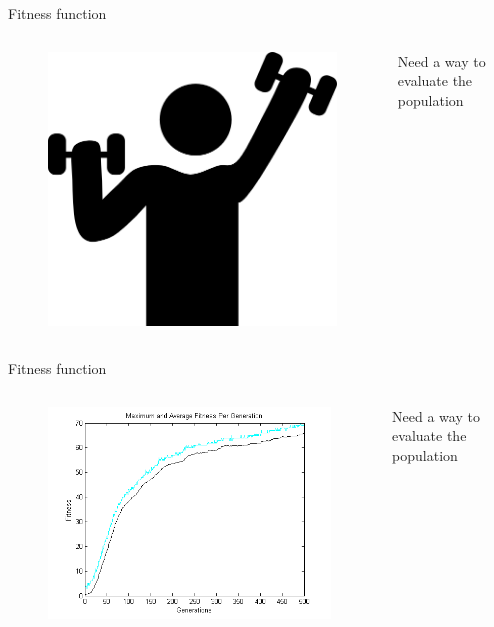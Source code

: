 \documentclass[24pt]{beamer}
\begin{document}
    \begin{frame}{Fitness function}
        \begin{columns}
                \begin{figure}
                \includegraphics[scale=0.5]{fitness}
                \end{figure}
                Need a way to evaluate the population
        \end{columns}
    \end{frame}

    \begin{frame}{Fitness function}
        \begin{columns}
                \begin{figure}
                \includegraphics[scale=0.4]{fitnessfunction}
                \end{figure}
                Need a way to evaluate the population
        \end{columns}
    \end{frame}
\end{document}
